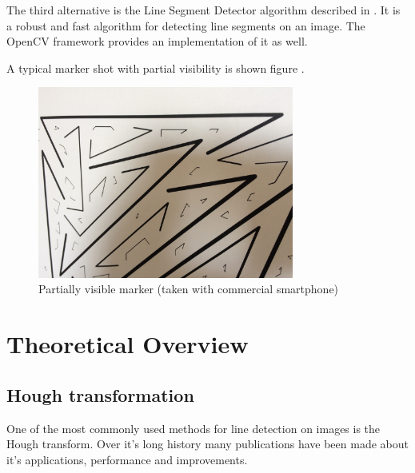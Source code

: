 The third alternative is the Line Segment Detector algorithm described in \cite{LSDDet}.
It is a robust and fast algorithm for detecting line segments on an image.
The OpenCV framework provides an implementation of it as well.

A typical marker shot with partial visibility is shown figure .
\begin{figure}[ht]
	\centering
	\includegraphics[width=0.75\textwidth]{figures/t35_01.JPG}
	\caption{Partially visible marker (taken with commercial smartphone)}
	\label{fig:partialMarkerShot}
\end{figure}


\section{Theoretical Overview}

\subsection{Hough transformation}

One of the most commonly used methods for line detection on images is the Hough transform.
Over it's long history many publications have been made about it's applications, performance and improvements.

